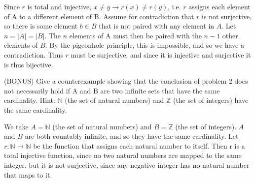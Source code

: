 \documentclass[solution, letterpaper]{cs20inclass}
\begin{document}
\begin{solution}
Since $r$ is total and injective, $x \neq y \rightarrow r(x) \neq r(y)$, i.e. $r$ assigns each element of A to a different element of B. Assume for contradiction that $r$ is not surjective, so there is some element $b \in B$ that is not paired with any element in $A$. Let $n = |A| = |B|$. The $n$ elements of A must then be paired with the $n - 1$ other elements of $B$. By the pigeonhole principle, this is impossible, and so we have a contradiction. Thus $r$ must be surjective, and since it is injective and surjective it is thus bijective.
\end{solution}

\problem (BONUS) Give a counterexample showing that the conclusion of problem 2 does not necessarily hold if A and B are two infinite sets that have the same cardinality. Hint: $\mathds{N}$ (the set of natural numbers) and $\mathds{Z}$ (the set of integers) have the same cardinality.


\begin{solution}
We take $A = \mathds{N}$ (the set of natural numbers) and $B = \mathds{Z}$ (the set of integers). $A$ and $B$ are both countably infinite, and so they have the same cardinality. Let $r : \mathds{N} \rightarrow \mathds{N}$ be the function that assigns each natural number to itself. Then r is a total injective function, since no two natural numbers are mapped to the same integer, but it is not surjective, since any negative integer has no natural number that maps to it.
\end{solution}
\end{document}
